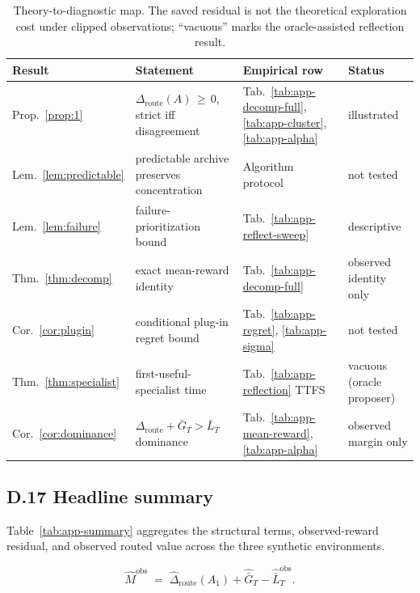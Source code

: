 \documentclass{article} %
\begin{document}
\begin{table}[h]
\centering
\small
\begin{tabular}{llll}
\toprule
Result & Statement & Empirical row & Status \\
\midrule
Prop.~\ref{prop:1}      & $\Delta_{\mathrm{route}}(A) \,\ge\, 0$, strict iff disagreement & Tab.~\ref{tab:app-decomp-full}, \ref{tab:app-cluster}, \ref{tab:app-alpha} & illustrated \\
Lem.~\ref{lem:predictable} & predictable archive preserves concentration & Algorithm protocol & not tested \\
Lem.~\ref{lem:failure} & failure-prioritization bound & Tab.~\ref{tab:app-reflect-sweep} & descriptive \\
Thm.~\ref{thm:decomp} & exact mean-reward identity & Tab.~\ref{tab:app-decomp-full} & observed identity only \\
Cor.~\ref{cor:plugin}   & conditional plug-in regret bound & Tab.~\ref{tab:app-regret}, \ref{tab:app-sigma} & not tested \\
Thm.~\ref{thm:specialist} & first-useful-specialist time & Tab.~\ref{tab:app-reflection} TTFS & vacuous (oracle proposer) \\
Cor.~\ref{cor:dominance} & $\Delta_{\mathrm{route}}+\bar G_T > \bar L_T$ dominance & Tab.~\ref{tab:app-mean-reward}, \ref{tab:app-alpha} & observed margin only \\
\bottomrule
\end{tabular}
\caption{Theory-to-diagnostic map. The saved residual is not the theoretical
exploration cost under clipped observations; ``vacuous'' marks the
oracle-assisted reflection result.}
\label{tab:app-coverage}
\end{table}

\subsection{D.17 Headline summary}

\label{app:tab-summary}

Table~\ref{tab:app-summary} aggregates the structural terms, observed-reward
residual, and observed routed value across the three synthetic environments.

\begin{equation}
\label{eq:app-tab-margin}
\widehat M^{\mathrm{obs}}
\;=\;
\widehat\Delta_{\mathrm{route}}(A_1)
+ \widehat{\bar G}_T
- \widehat{\bar L}_T^{\mathrm{obs}}.
\end{equation}
\end{document}
